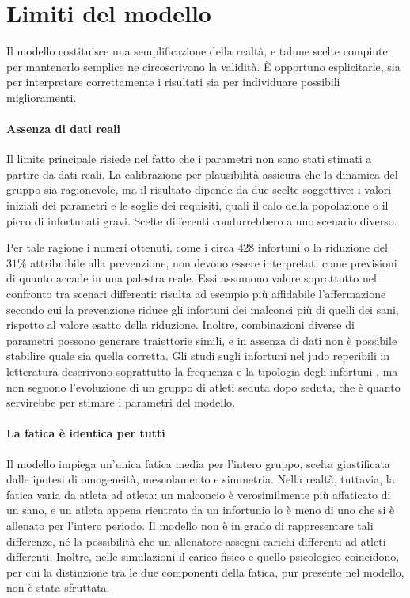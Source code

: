 \section{Limiti del modello}

Il modello costituisce una semplificazione della realtà, e talune scelte compiute per mantenerlo semplice ne circoscrivono la validità. È opportuno esplicitarle, sia per interpretare correttamente i risultati sia per individuare possibili miglioramenti.

\paragraph{Assenza di dati reali}

Il limite principale risiede nel fatto che i parametri non sono stati stimati a partire da dati reali. La calibrazione per plausibilità assicura che la dinamica del gruppo sia ragionevole, ma il risultato dipende da due scelte soggettive: i valori iniziali dei parametri e le soglie dei requisiti, quali il calo della popolazione o il picco di infortunati gravi. Scelte differenti condurrebbero a uno scenario diverso. \par

Per tale ragione i numeri ottenuti, come i circa $428$ infortuni o la riduzione del $31\%$ attribuibile alla prevenzione, non devono essere interpretati come previsioni di quanto accade in una palestra reale. Essi assumono valore soprattutto nel confronto tra scenari differenti: risulta ad esempio più affidabile l'affermazione secondo cui la prevenzione riduce gli infortuni dei malconci più di quelli dei sani, rispetto al valore esatto della riduzione. Inoltre, combinazioni diverse di parametri possono generare traiettorie simili, e in assenza di dati non è possibile stabilire quale sia quella corretta. Gli studi sugli infortuni nel judo reperibili in letteratura descrivono soprattutto la frequenza e la tipologia degli infortuni \cite{pocecco2013}, ma non seguono l'evoluzione di un gruppo di atleti seduta dopo seduta, che è quanto servirebbe per stimare i parametri del modello.

\paragraph{La fatica è identica per tutti}

Il modello impiega un'unica fatica media per l'intero gruppo, scelta giustificata dalle ipotesi di omogeneità, mescolamento e simmetria. Nella realtà, tuttavia, la fatica varia da atleta ad atleta: un malconcio è verosimilmente più affaticato di un sano, e un atleta appena rientrato da un infortunio lo è meno di uno che si è allenato per l'intero periodo. Il modello non è in grado di rappresentare tali differenze, né la possibilità che un allenatore assegni carichi differenti ad atleti differenti. Inoltre, nelle simulazioni il carico fisico e quello psicologico coincidono, per cui la distinzione tra le due componenti della fatica, pur presente nel modello, non è stata sfruttata.

